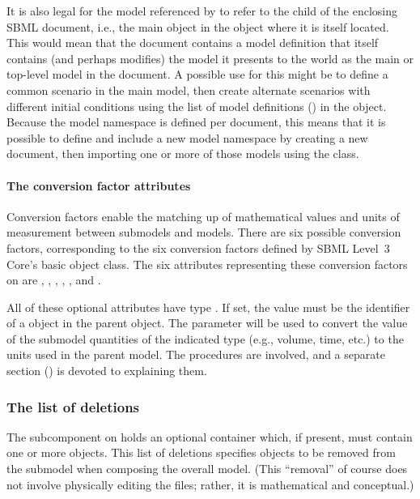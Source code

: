 It is also legal for the model referenced by  to refer
to the  child of the enclosing SBML document, i.e., the
main \Model object in the \SBML object where it is itself located.  This
would mean that the document contains a model definition that itself
contains (and perhaps modifies) the model it presents to the world as
the main or top-level model in the document.  A possible use for this
might be to define a common scenario in the main model, then create
alternate scenarios with different initial conditions using the list of
model definitions () in the \SBML object.
Because the model namespace is defined per document, this means that it
is possible to define and include a new model namespace by creating a
new document, then importing one or more of those models using the
\ExternalModelDefinition class.


\paragraph{The conversion factor attributes}

Conversion factors enable the matching up of mathematical values and
units of measurement between submodels and models.  There are six
possible conversion factors, corresponding to the six conversion factors
defined by SBML Level~3 Core's basic \Model object class.  The six
attributes representing these conversion factors on \Submodel are
, ,
, ,
, and .

All of these optional attributes have type .  If set,
the value must be the identifier of a \Parameter object in the parent
\Model object.  The parameter will be used to convert the value of the
submodel quantities of the indicated type (e.g., volume, time, etc.) to
the units used in the parent model.  The procedures are involved, and a
separate section () is devoted to explaining
them.


\subsubsection{The list of deletions}
\label{listofdeletions}

The  subcomponent on \Submodel holds an optional
\ListOfDeletions container which, if present, must contain one or more
\Deletion objects.  This list of deletions specifies objects to be
removed from the submodel when composing the overall model.  (This
``removal'' of course does not involve physically editing the files;
rather, it is mathematical and conceptual.)


